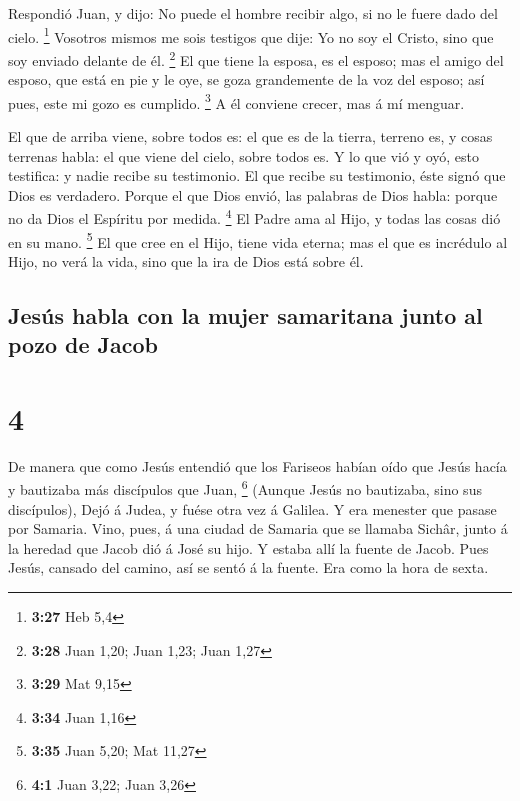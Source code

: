  Respondió Juan, y dijo: No puede el hombre recibir algo,
si no le fuere dado del cielo. \footnote{\textbf{3:27} Heb 5,4}
 Vosotros mismos me sois testigos que dije: Yo no soy el
Cristo, sino que soy enviado delante de él. \footnote{\textbf{3:28} Juan
  1,20; Juan 1,23; Juan 1,27}  El que tiene la esposa, es
el esposo; mas el amigo del esposo, que está en pie y le oye, se goza
grandemente de la voz del esposo; así pues, este mi gozo es cumplido.
\footnote{\textbf{3:29} Mat 9,15}  A él conviene crecer,
mas á mí menguar.

 El que de arriba viene, sobre todos es: el que es de la
tierra, terreno es, y cosas terrenas habla: el que viene del cielo,
sobre todos es.  Y lo que vió y oyó, esto testifica: y
nadie recibe su testimonio.  El que recibe su testimonio,
éste signó que Dios es verdadero.  Porque el que Dios
envió, las palabras de Dios habla: porque no da Dios el Espíritu por
medida. \footnote{\textbf{3:34} Juan 1,16}  El Padre ama al
Hijo, y todas las cosas dió en su mano. \footnote{\textbf{3:35} Juan
  5,20; Mat 11,27}  El que cree en el Hijo, tiene vida
eterna; mas el que es incrédulo al Hijo, no verá la vida, sino que la
ira de Dios está sobre él.

\hypertarget{jesuxfas-habla-con-la-mujer-samaritana-junto-al-pozo-de-jacob}{%
\subsection{Jesús habla con la mujer samaritana junto al pozo de
Jacob}\label{jesuxfas-habla-con-la-mujer-samaritana-junto-al-pozo-de-jacob}}

\hypertarget{section-3}{%
\section{4}\label{section-3}}

 De manera que como Jesús entendió que los Fariseos habían
oído que Jesús hacía y bautizaba más discípulos que Juan, \footnote{\textbf{4:1}
  Juan 3,22; Juan 3,26}  (Aunque Jesús no bautizaba, sino
sus discípulos),  Dejó á Judea, y fuése otra vez á Galilea.
 Y era menester que pasase por Samaria.  Vino,
pues, á una ciudad de Samaria que se llamaba Sichâr, junto á la heredad
que Jacob dió á José su hijo.  Y estaba allí la fuente de
Jacob. Pues Jesús, cansado del camino, así se sentó á la fuente. Era
como la hora de sexta.

